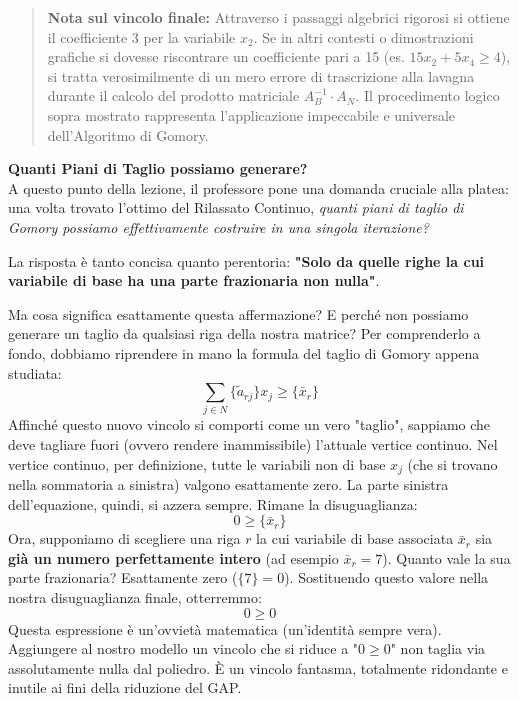 \documentclass[12pt, a4paper]{article}
\begin{document}
	\begin{quote}
		\textbf{Nota sul vincolo finale:} Attraverso i passaggi algebrici rigorosi si ottiene il coefficiente 3 per la variabile $x_2$. Se in altri contesti o dimostrazioni grafiche si dovesse riscontrare un coefficiente pari a 15 (es. $15x_2 + 5x_4 \geq 4$), si tratta verosimilmente di un mero errore di trascrizione alla lavagna durante il calcolo del prodotto matriciale $A_B^{-1} \cdot A_N$. Il procedimento logico sopra mostrato rappresenta l'applicazione impeccabile e universale dell'Algoritmo di Gomory.
	\end{quote}
	
	\vspace{0.6cm}
	\textbf{Quanti Piani di Taglio possiamo generare?}\\
	A questo punto della lezione, il professore pone una domanda cruciale alla platea: una volta trovato l'ottimo del Rilassato Continuo, \textit{quanti piani di taglio di Gomory possiamo effettivamente costruire in una singola iterazione?}
	
	La risposta è tanto concisa quanto perentoria: \textbf{"Solo da quelle righe la cui variabile di base ha una parte frazionaria non nulla"}.
	
	Ma cosa significa esattamente questa affermazione? E perché non possiamo generare un taglio da qualsiasi riga della nostra matrice?
	Per comprenderlo a fondo, dobbiamo riprendere in mano la formula del taglio di Gomory appena studiata:
	\[
	\sum_{j \in N} \{\tilde{a}_{rj}\} x_j \geq \{\bar{x}_r\}
	\]
	Affinché questo nuovo vincolo si comporti come un vero "taglio", sappiamo che deve tagliare fuori (ovvero rendere inammissibile) l'attuale vertice continuo. Nel vertice continuo, per definizione, tutte le variabili non di base $x_j$ (che si trovano nella sommatoria a sinistra) valgono esattamente zero. La parte sinistra dell'equazione, quindi, si azzera sempre. Rimane la disuguaglianza:
	\[
	0 \geq \{\bar{x}_r\}
	\]
	Ora, supponiamo di scegliere una riga $r$ la cui variabile di base associata $\bar{x}_r$ sia \textbf{già un numero perfettamente intero} (ad esempio $\bar{x}_r = 7$). Quanto vale la sua parte frazionaria? Esattamente zero ($\{7\} = 0$). 
	Sostituendo questo valore nella nostra disuguaglianza finale, otterremmo:
	\[
	0 \geq 0
	\]
	Questa espressione è un'ovvietà matematica (un'identità sempre vera). Aggiungere al nostro modello un vincolo che si riduce a "$0 \geq 0$" non taglia via assolutamente nulla dal poliedro. È un vincolo fantasma, totalmente ridondante e inutile ai fini della riduzione del GAP. 
	
\end{document}
